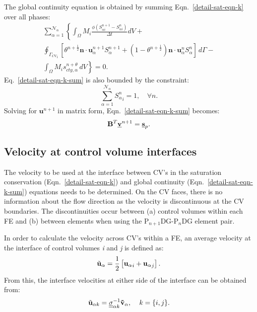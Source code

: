 \documentclass[times]{fldauth}
\newcommand{\PNDG}[2][error]{P$_{#1}$DG-P$_{#2}$DG}
\begin{document}
The global continuity equation is obtained by summing
Eqn.~\ref{detail-sat-eqn-k} over all phases:
\begin{eqnarray}
  \sum\limits_{\alpha=1}^{\mathcal{N}_{\alpha}} \left\lbrace
  \int_{\Omega} M_{i} \displaystyle\frac{\phi\left({S_{\alpha
        i}^{n+1}}-{S_{\alpha i}^{n}}\right) } {\Delta t} dV +
  \right. \nonumber \\ \left. \displaystyle\oint_{{\Gamma_{CV}}_{i}}
  \left[\theta^{n+\frac{1}{2}} {\mathbf n} \cdot {\mathbf
      u}_{\alpha}^{n+1} S_{\alpha}^{n+1} +
    \left(1-\theta^{n+\frac{1}{2}}\right) {\mathbf n} \cdot {\mathbf
      u}_{\alpha}^{n} S_{\alpha}^{n} \right] \,d\Gamma -
  \right. \nonumber \\ \left. \displaystyle\int_{\Omega} M_{i}
  s_{cty,\alpha}^{n+\theta}\, dV \right\rbrace = 0.
           \label{detail-sat-eqn-k-sum}
\end{eqnarray}
Eq.~\ref{detail-sat-eqn-k-sum} is also bounded by the constraint:
\begin{equation}
  \sum\limits_{\alpha=1}^{\mathcal{N}_{\alpha}} {S_{\alpha}^{n}}_{i} =
  1, \quad \forall n.
\end{equation}
Solving for ${\mathbf u}^{n+1}$ in matrix form,
Eqn.~\ref{detail-sat-eqn-k-sum} becomes:
\begin{equation}
  {\mathbf B}^T \underline{\bf v}^{n+1} = \underline{\bf s}_{p}.
  \label{glob-cty-matrix}
\end{equation}


\subsection{Velocity at control volume interfaces} \label{opt-up} 
The velocity to be used at the interface between CV's in the saturation conservation (Eqn.~\ref{detail-sat-eqn-k}) and global continuity (Eqn.~\ref{detail-sat-eqn-k-sum}) equations needs to be determined. On the CV faces, there is no information about the flow direction as the velocity is discontinuous at the CV boundaries. The discontinuities occur between (a) control volumes within each FE and (b) between elements when using the \PNDG[n+1]{n} element pair.

In order to calculate the velocity across CV's within a FE, an average velocity at the interface of control volumes {\it i} and {\it j} is defined as:
\begin{equation}
  {\tilde{\bf u}}_\alpha = \frac{1}{2} \left[ {{\bf u}_\alpha}_i + {{\bf u}_\alpha}_j \right].
\end{equation} 
From this, the interface velocities at either side of the interface can be obtained from:
\begin{equation}
  {\tilde{\bf u}}_{\alpha k} = \underline{\underline{\sigma}}_{\alpha k}^{-1}{{\bf \tilde{v}}}_{\alpha}, \;\;\;\; k=\{i,j\}. 
  \label{two-vels}
\end{equation} 
\end{document}
